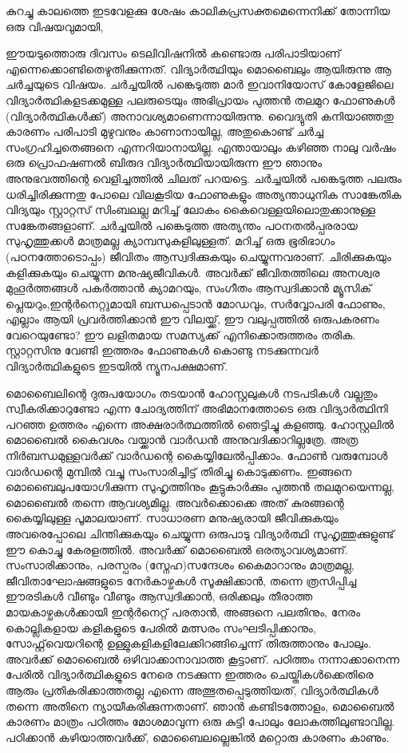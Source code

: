\vskip 2pt

കുറച്ചു കാലത്തെ ഇടവേളക്കു ശേഷം കാലികപ്രസക്തമെന്നെനിക്ക് തോന്നിയ ഒരു വിഷയവുമായി,

ഈയടുത്തൊരു ദിവസം ടെലിവിഷനില്‍ കണ്ടൊരു പരിപാടിയാണ് എന്നെക്കൊണ്ടിതെഴുതിക്കുന്നത്. 
വിദ്യാര്‍ത്ഥിയും മൊബൈലും ആയിരുന്നു ആ ചര്‍ച്ചയുടെ വിഷയം. ചര്‍ച്ചയില്‍ പങ്കെടുത്ത മാര്‍ ഇവാനിയോസ് കോളേജിലെ 
വിദ്യാര്‍ത്ഥികളടക്കമുള്ള പലരുടെയും അഭിപ്രായം പുത്തന്‍ തലമുറ ഫോണുകള്‍ (വിദ്യാര്‍ത്ഥികള്‍ക്ക്) അനാവശ്യമാണെന്നായിരുന്നു.
 വൈദ്യുതി കനിയാഞ്ഞതു കാരണം പരിപാടി മുഴുവനും കാണാനായില്ല, അതുകൊണ്ട് ചര്‍ച്ച സംഗ്രഹിച്ചതെങ്ങനെ
 എന്നറിയാനായില്ല. എന്തായാലും കഴിഞ്ഞ നാലു വര്‍ഷം ഒരു പ്രൊഫഷണല്‍ ബിരുദ വിദ്യാര്‍ത്ഥിയായിരുന്ന 
ഈ ഞാനും അനുഭവത്തിന്റെ വെളിച്ചത്തില്‍ ചിലത് പറയട്ടെ. ചര്‍ച്ചയില്‍ പങ്കെടുത്ത പലരും ധരിച്ചിരിക്കുന്നതു
 പോലെ വിലകൂടിയ ഫോണുകളും അത്യന്താധുനിക സാങ്കേതിക വിദ്യയും സ്റ്റാറ്റസ് സിംബലല്ല മറിച്ച് ലോകം 
കൈവെള്ളയിലൊതുക്കാനുള്ള സങ്കേതങ്ങളാണ്. ചര്‍ച്ചയില്‍ പങ്കെടുത്ത അത്യന്തം പഠനതല്‍പ്പരരായ സുഹൃത്തുക്കള്‍ 
മാത്രമല്ല ക്യാമ്പസുകളിലുള്ളത്. മറിച്ച് ഒരു ഭൂരിഭാഗം (പഠനത്തോടൊപ്പം) ജീവിതം ആസ്വദിക്കുകയും ചെയ്യുന്നവരാണ്. 
ചിരിക്കുകയും കളിക്കുകയും ചെയ്യുന്ന മനുഷ്യജീവികള്‍. അവര്‍ക്ക് ജീവിതത്തിലെ അനശ്വര മുഹൂര്‍ത്തങ്ങള്‍ പകര്‍ത്താന്‍ 
ക്യാമറയും, സംഗീതം ആസ്വദിക്കാന്‍ മ്യൂസിക് പ്ലെയറും,ഇന്റര്‍നെറ്റുമായി ബന്ധപ്പെടാന്‍ മോഡവും, സര്‍വ്വോപരി ഫോണും, 
എല്ലാം ആയി പ്രവര്‍ത്തിക്കാന്‍ ഈ വിലയ്ക്ക്, ഈ വലുപ്പത്തില്‍ ഒരുപകരണം വേറെയുണ്ടോ? ഈ ലളിതമായ സമസ്യക്ക് 
എനിക്കൊരുത്തരം തരിക. സ്റ്റാറ്റസിനു വേണ്ടി ഇത്തരം ഫോണുകള്‍ കൊണ്ടു നടക്കുന്നവര്‍ വിദ്യാര്‍ത്ഥികളുടെ ഇടയില്‍
 ന്യൂനപക്ഷമാണ്.

മൊബൈലിന്റെ ദുരുപയോഗം തടയാന്‍ ഹോസ്റ്റലുകള്‍ നടപടികള്‍ വല്ലതും സ്വീകരിക്കാറുണ്ടോ എന്ന ചോദ്യത്തിന് 
അഭിമാനത്തോടെ ഒരു വിദ്യാര്‍ത്ഥിനി പറഞ്ഞ ഉത്തരം എന്നെ അക്ഷരാര്‍ത്ഥത്തില്‍ ഞെട്ടിച്ചു കളഞ്ഞു. ഹോസ്റ്റലില്‍ 
മൊബൈല്‍ കൈവശം വയ്ക്കാന്‍ വാര്‍ഡന്‍ അനുവദിക്കാറില്ലത്രേ. അത്ര നിര്‍ബന്ധമുള്ളവര്‍ക്ക് വാര്‍ഡന്റെ കൈയ്യിലേല്‍പ്പിക്കാം. 
ഫോണ്‍ വരുമ്പോള്‍ വാര്‍ഡന്റെ മുമ്പില്‍ വച്ചു സംസാരിച്ചിട്ട് തിരിച്ചു കൊടുക്കണം. ഇങ്ങനെ മൊബൈലുപയോഗിക്കുന്ന 
സുഹൃത്തിനും കൂട്ടുകാര്‍ക്കും പുത്തന്‍ തലമുറയെന്നല്ല, മൊബൈല്‍ തന്നെ ആവശ്യമില്ല. അവര്‍ക്കൊക്കെ അത് കുരങ്ങന്റെ 
കൈയ്യിലുള്ള പൂമാലയാണ്. സാധാരണ മനുഷ്യരായി ജീവിക്കുകയും അവരെപ്പോലെ ചിന്തിക്കുകയും ചെയ്യുന്ന ഒരുപാടു 
വിദ്യാര്‍ത്ഥി സുഹൃത്തുക്കുളുണ്ട് ഈ കൊച്ചു കേരളത്തില്‍. അവര്‍ക്ക് മൊബൈല്‍ ഒരത്യാവശ്യമാണ്. സംസാരിക്കാനും, 
പരസ്പരം (സ്നേഹ)സന്ദേശം കൈമാറാനും മാത്രമല്ല, ജീവിതാഘോഷങ്ങളുടെ നേര്‍കാഴ്ചകള്‍ സൂക്ഷിക്കാന്‍, തന്നെ 
ത്രസിപ്പിച്ച ഈരടികള്‍ വീണ്ടും വീണ്ടും ആസ്വദിക്കാന്‍, ഒരിക്കലും തീരാത്ത മായകാഴ്ചകള്‍ക്കായി ഇന്റര്‍നെറ്റ് പരതാന്‍,
 അങ്ങനെ പലതിനും, നേരം കൊല്ലികളായ കളികളുടെ പേരില്‍ മത്സരം സംഘടിപ്പിക്കാനും, സോഫ്റ്റ്‌വെയറിന്റെ
 ഉള്ളുകളികളിലേക്കിറങ്ങിച്ചെന്ന് തിരുത്താനും പോലും. അവര്‍ക്ക് മൊബൈല്‍ ഒഴിവാക്കാനാവാത്ത കൂട്ടാണ്. 
പഠിത്തം നന്നാക്കാനെന്ന പേരില്‍ വിദ്യാര്‍ത്ഥികളുടെ നേരെ നടക്കുന്ന ഇത്തരം ചെയ്തികള്‍ക്കെതിരെ ആരും
 പ്രതികരിക്കാത്തതല്ല എന്നെ അത്ഭുതപ്പെടുത്തിയത്, വിദ്യാര്‍ത്ഥികള്‍ തന്നെ അതിനെ ന്യായീകരിക്കുന്നതാണ്. 
ഞാന്‍ കണ്ടിടത്തോളം, മൊബൈല്‍ കാരണം മാത്രം പഠിത്തം മോശമാവുന്ന ഒരു കുട്ടി പോലും ലോകത്തിലുണ്ടാവില്ല.
 പഠിക്കാന്‍ കഴിയാത്തവര്‍ക്ക്, മൊബൈലല്ലെങ്കില്‍ മറ്റൊരു കാരണം കാണും.

